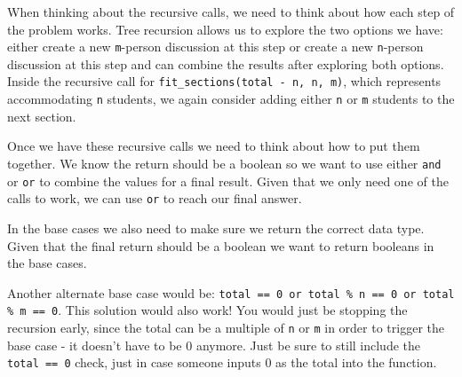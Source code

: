     \begin{solution}
    \begin{blocksection}
    When thinking about the recursive calls, we need to think about how each step of the problem works. Tree recursion allows us to explore the two options we have: 
    either create a new \lstinline{m}-person discussion at this step or create a new \lstinline{n}-person discussion at this step and can combine the results after exploring both options. 
    Inside the recursive call for \lstinline{fit_sections(total - n, n, m)}, which represents accommodating \lstinline{n} students, we again consider adding either
    \lstinline{n} or \lstinline{m} students to the next section.
    
    Once we have these recursive calls we need to think about how to put them together. We know the return should be a boolean so we want to use either \lstinline{and} or \lstinline{or} to combine the values for a final result. Given that we only need one of the calls to work, we can use \lstinline{or} to reach our final answer.
    
    In the base cases we also need to make sure we return the correct data type. Given that the final return should be a boolean we want to return booleans in the base cases.
    
    Another alternate base case would be: \lstinline{total == 0 or total % n == 0 or total % m == 0}. This solution would also work! You would just be stopping the recursion early, since the total can be a multiple of \lstinline{n} or \lstinline{m} in order to trigger the base case - it doesn't have to be 0 anymore. Just be sure to still include the \lstinline{total == 0} check, just in case someone inputs 0 as the total into the function.
    \end{blocksection}
    \end{solution}
    

